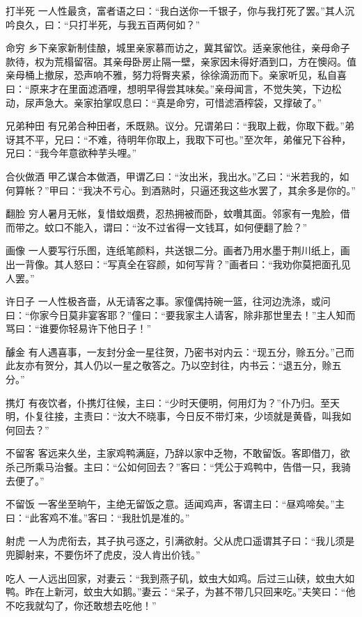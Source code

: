 \documentclass[12pt,UTF8]{ctexbook}
\begin{document}
打半死
一人性最贪，富者语之曰：“我白送你一千银子，你与我打死了罢。”其人沉吟良久，曰：“只打半死，与我五百两何如？”

命穷
乡下亲家新制佳酿，城里亲家慕而访之，冀其留饮。适亲家他往，亲母命子款待，权为荒榻留宿。其亲母卧房止隔一壁，亲家因未得好酒到口，方在懊闷。值亲母桶上撤尿，恐声响不雅，努力将臀夹紧，徐徐滴沥而下。亲家听见，私自喜曰：“原来才在里面滤酒哩，想明早得尝其味矣。”亲母闻言，不觉失笑，下边松动，尿声急大。亲家拍掌叹息曰：“真是命穷，可惜滤酒榨袋，又撑破了。”

兄弟种田
有兄弟合种田者，禾既熟。议分。兄谓弟曰：“我取上截，你取下截。”弟讶其不平，兄曰：“不难，待明年你取上，我取下可也。”至次年，弟催兄下谷种，兄曰：“我今年意欲种芋头哩。”

合伙做酒
甲乙谋合本做酒，甲谓乙曰：“汝出米，我出水。”乙曰：“米若我的，如何算帐？”甲曰：“我决不亏心。到酒熟时，只逼还我这些水罢了，其余多是你的。”

翻脸
穷人暑月无帐，复惜蚊烟费，忍热拥被而卧，蚊囋其面。邻家有一鬼脸，借而带之。蚊口不能入，谓曰：“汝不过省得一文钱耳，如何便翻了脸？”

画像
一人要写行乐图，连纸笔颜料，共送银二分。画者乃用水墨于荆川纸上，画出一背像。其人怒曰：“写真全在容颜，如何写背？”画者曰：“我劝你莫把面孔见人罢。”

许日子
一人性极吝啬，从无请客之事。家僮偶持碗一篮，往河边洗涤，或问曰：“你家今日莫非宴客耶？”僮曰：“要我家主人请客，除非那世里去！”主人知而骂曰：“谁要你轻易许下他日子！”

醵金
有人遇喜事，一友封分金一星往贺，乃密书对内云：“现五分，赊五分。”己而此友亦有贺分，其人仍以一星之敬答之。乃以空封往，内书云：“退五分，赊五分。”

携灯
有夜饮者，仆携灯往候，主曰：“少时天便明，何用灯为？”仆乃归。至天明，仆复往接，主责曰：“汝大不晓事，今日反不带灯来，少顷就是黄昏，叫我如何回去？”

不留客
客远来久坐，主家鸡鸭满庭，乃辞以家中乏物，不敢留饭。客即借刀，欲杀己所乘马治餐。主曰：“公如何回去？”客曰：“凭公于鸡鸭中，告借一只，我骑去便了。”

不留饭
一客坐至晌午，主绝无留饭之意。适闻鸡声，客谓主曰：“昼鸡啼矣。”主曰：“此客鸡不准。”客曰：“我肚饥是准的。”

射虎
一人为虎衔去，其子执弓逐之，引满欲射。父从虎口遥谓其子曰：“我儿须是兜脚射来，不要伤坏了虎皮，没人肯出价钱。”

吃人
一人远出回家，对妻云：“我到燕子矶，蚊虫大如鸡。后过三山硖，蚊虫大如鸭。昨在上新河，蚊虫大如鹅。”妻云：“呆子，为甚不带几只回来吃。”夫笑曰：“他不吃我就勾了，你还敢想去吃他！”
\end{document}

